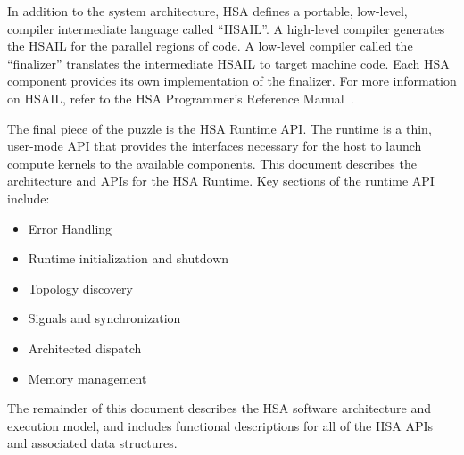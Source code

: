 \documentclass[final]{book}
\begin{document}
In addition to the system architecture, HSA defines a portable, low-level,
compiler intermediate language called ``HSAIL''.  A high-level compiler generates
the HSAIL for the parallel regions of code. A low-level compiler called the
``finalizer'' translates the intermediate HSAIL to target machine code.  Each 
HSA component provides its own implementation of the finalizer.  For more
information on HSAIL, refer to the HSA Programmer's Reference Manual~\cite{prm}.

The final piece of the puzzle is the HSA Runtime API.  The runtime is a thin,
user-mode API that provides the interfaces necessary for the host to launch
compute kernels to the available components. This document describes the
architecture and APIs for the HSA Runtime. Key sections of the runtime API
include:
\begin{itemize}
\item Error Handling
\item Runtime initialization and shutdown
\item Topology discovery
\item Signals and synchronization
\item Architected dispatch
\item Memory management
\end{itemize}

The remainder of this document describes the HSA software architecture and
execution model, and includes functional descriptions for all of the HSA APIs
and associated data structures.
\end{document}
